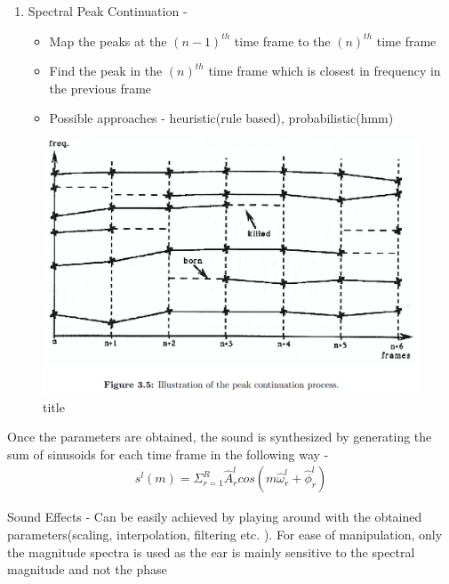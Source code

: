 \documentclass[11pt]{article}
\makeatletter
\def\maxwidth{\ifdim\Gin@nat@width>\linewidth\linewidth
    \else\Gin@nat@width\fi}
\let\Oldincludegraphics\includegraphics
\renewcommand{\includegraphics}[1]{\Oldincludegraphics[width=.8\maxwidth]{#1}}
\providecommand{\tightlist}{%
      \setlength{\itemsep}{0pt}\setlength{\parskip}{0pt}}
\makeatother
\begin{document}
    \begin{enumerate}
\def\labelenumi{\arabic{enumi}.}
\setcounter{enumi}{1}
\tightlist
\item
  Spectral Peak Continuation -

  \begin{itemize}
  \tightlist
  \item
    Map the peaks at the \((n-1)^{th}\) time frame to the \((n)^{th}\)
    time frame
  \item
    Find the peak in the \((n)^{th}\) time frame which is closest in
    frequency in the previous frame
  \item
    Possible approaches - heuristic(rule based), probabilistic(hmm)
  \end{itemize}
\end{enumerate}

    \begin{figure}
\centering
\includegraphics{fig_4.png}
\caption{title}
\end{figure}

    Once the parameters are obtained, the sound is synthesized by generating
the sum of sinusoids for each time frame in the following way -\\

\begin{align}
s^{l}(m) = \Sigma_{r=1}^{R} \hat A^{l}_{r}cos(m\hat \omega^{l}_{r} + \hat \phi^{l}_{r})
\end{align}

    Sound Effects - Can be easily achieved by playing around with the
obtained parameters(scaling, interpolation, filtering etc. ). For ease
of manipulation, only the magnitude spectra is used as the ear is mainly
sensitive to the spectral magnitude and not the phase
\end{document}
